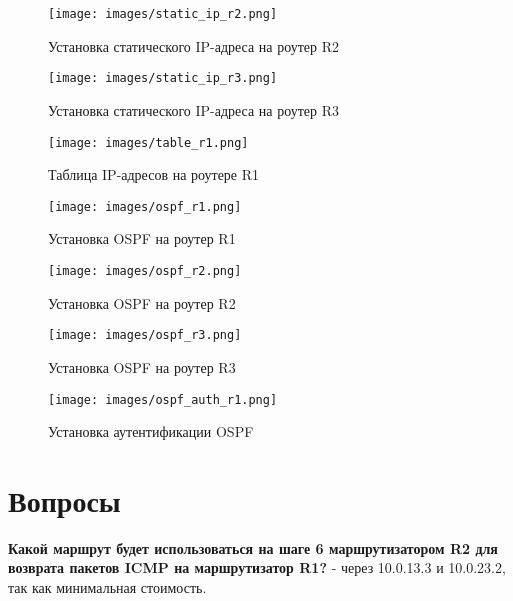 \documentclass[14pt, a4paper]{article}
\begin{document}
    \begin{figure}[H]
        \centering
        \texttt{[image: images/static\_ip\_r2.png]}
        \caption{Установка статического IP-адреса на роутер R2}
    \end{figure}

    \begin{figure}[H]
        \centering
        \texttt{[image: images/static\_ip\_r3.png]}
        \caption{Установка статического IP-адреса на роутер R3}
    \end{figure}

    \begin{figure}[H]
        \centering
        \texttt{[image: images/table\_r1.png]}
        \caption{Таблица IP-адресов на роутере R1}
    \end{figure}

    \begin{figure}[H]
        \centering
        \texttt{[image: images/ospf\_r1.png]}
        \caption{Установка OSPF на роутер R1}
    \end{figure}

    \begin{figure}[H]
        \centering
        \texttt{[image: images/ospf\_r2.png]}
        \caption{Установка OSPF на роутер R2}
    \end{figure}

    \begin{figure}[H]
        \centering
        \texttt{[image: images/ospf\_r3.png]}
        \caption{Установка OSPF на роутер R3}
    \end{figure}

    \begin{figure}[H]
        \centering
        \texttt{[image: images/ospf\_auth\_r1.png]}
        \caption{Установка аутентификации OSPF}
    \end{figure}

    \section*{Вопросы}

    \textbf{Какой маршрут будет использоваться на шаге 6 маршрутизатором R2 для возврата пакетов ICMP на маршрутизатор R1?} - через 10.0.13.3 и 10.0.23.2, так как минимальная стоимость.
\end{document}
